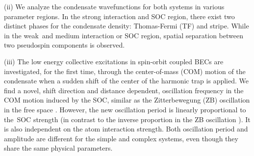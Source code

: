 \documentclass[prl,twocolumn,showpacs,floatfix]{revtex4}
\begin{document}
(ii) We analyze the condensate wavefunctions for both systems in various
parameter regions. In the strong interaction and SOC region, there exist two
distinct phases for the condensate density: Thomas-Fermi (TF) and stripe.
While in the weak\ and medium interaction or SOC region, spatial separation
between two pseudospin components is observed.

(iii) The low energy collective excitations in spin-orbit coupled BECs are
investigated, for the first time, through the center-of-mass (COM) motion of
the condensate when a sudden shift of the center of the harmonic trap is
applied. We find a novel, shift direction and distance dependent,
oscillation frequency in the COM motion induced by the SOC, similar as the
Zitterbewegung (ZB) oscillation in the free space \cite{Vaishnav}. However,
the new oscillation period is linearly proportional to the\ SOC strength (in
contrast to the inverse proportion in the ZB oscillation \cite{Vaishnav}).
It is also independent on the atom interaction strength. Both oscillation
period and amplitude are different for the simple and complex systems, even
though they share the same physical parameters.
\end{document}

